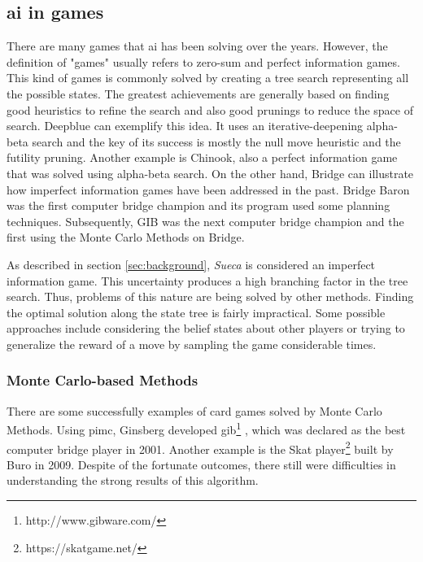 \subsection{\gls{ai} in games}
 
 
There are many games that \gls{ai} has been solving over the years.
However, the definition of "games" usually refers to zero-sum and perfect information games.
This kind of games is commonly solved by creating a tree search representing all the possible states.
The greatest achievements are generally based on finding good heuristics to refine the search and also good prunings to reduce the space of search.
Deepblue can exemplify this idea.
It uses an iterative-deepening alpha-beta search and the key of its success is mostly the null move heuristic and the futility pruning.
Another example is Chinook, also a perfect information game that was solved using alpha-beta search.
On the other hand, Bridge can illustrate how imperfect information games have been addressed in the past.
Bridge Baron was the first computer bridge champion and its program used some planning techniques.
Subsequently, GIB was the next computer bridge champion and the first using the Monte Carlo Methods on Bridge.


As described in section \ref{sec:background}, \emph{Sueca} is considered an imperfect information game.
This uncertainty produces a high branching factor in the tree search.
Thus, problems of this nature are being solved by other methods.
Finding the optimal solution along the state tree is fairly impractical.
Some possible approaches include considering the belief states about other players or trying to generalize the reward of a move by sampling the game considerable times.



\subsubsection{Monte Carlo-based Methods}


There are some successfully examples of card games solved by Monte Carlo Methods.
Using \gls{pimc}, Ginsberg developed \gls{gib}\footnote{http://www.gibware.com/} \cite{Ginsberg2001}, which was declared as the best computer bridge player in 2001.
Another example is the Skat player\footnote{https://skatgame.net/} built by Buro in 2009.
Despite of the fortunate outcomes, there still were difficulties in understanding the strong results of this algorithm.


